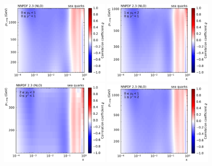 \begin{figure}[htbp]
    \centering
    \includegraphics[width=0.49\textwidth]{figures/pdf_constraints/corr_PTMAXEXPYS_YBYS_NLO_FINALBINS_NNPDF23_sea_quarks_ys0_0yb0_0_cl.pdf}\hfill
    \includegraphics[width=0.49\textwidth]{figures/pdf_constraints/corr_PTMAXEXPYS_YBYS_NLO_FINALBINS_NNPDF23_sea_quarks_ys0_0yb1_0_cl.pdf}\hfill
    \includegraphics[width=0.49\textwidth]{figures/pdf_constraints/corr_PTMAXEXPYS_YBYS_NLO_FINALBINS_NNPDF23_sea_quarks_ys0_0yb2_0_cl.pdf}\hfill
    \includegraphics[width=0.49\textwidth]{figures/pdf_constraints/corr_PTMAXEXPYS_YBYS_NLO_FINALBINS_NNPDF23_sea_quarks_ys1_0yb0_0_cl.pdf}\hfill

\end{figure}

